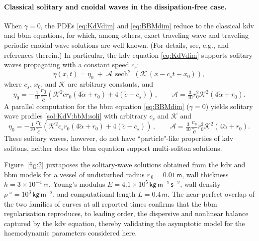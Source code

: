 \documentclass[alpha-refs, 12pt]{wiley-article}
\DeclareMathOperator{\sech}{sech}
\begin{document}
\paragraph{Classical solitary and cnoidal waves in the dissipation‐free case.} When $\gamma=0$, the PDEs \cref{eq:KdVdim} and \cref{eq:BBMdim} reduce to the classical \acrshort{kdv} and \acrshort{bbm} equations, for which, among others, exact traveling wave and traveling periodic cnoidal wave solutions are well known. (For details, see, e.g., \cite{cheviakov2024analytical} and references therein.) In particular, the \acrshort{kdv} equation \cref{eq:KdVdim} supports solitary waves propagating with a constant speed $c_{s}$:
\begin{equation}\label{sol:KdV:bbM:soli}
  \eta(x,t)=\eta_0 \;+\; \mathcal{A}\,\sech^{2}\,\left(\mathcal{K}\,(x-c_{s}t-x_0)\right),
\end{equation}
where $c_s$, $x_0$, and $\mathcal{K}$ are arbitrary constants, and
\[ %
\eta_0 = -\tfrac{1}{10}\dfrac{r_0}{\tilde{c}} \left(\mathcal{K}^2 \tilde{c} r_0 (4 \tilde{\alpha} + r_0) + 4(\tilde{c}-c_s)\right)\,,\qquad \mathcal{A} = \tfrac{3}{10} r_0^2 \mathcal{K}^2 \left(4 \tilde{\alpha}  + r_0\right).
\]
A parallel computation for the \acrshort{bbm} equation \cref{eq:BBMdim} ($\gamma=0$) yields solitary wave profiles \eqref{sol:KdV:bbM:soli} with arbitrary $c_s$ and $\mathcal{K}$ and
\[%
\eta_0 = -\tfrac{1}{10}\dfrac{r_0}{\tilde{c}} \left(\mathcal{K}^2 c_s r_0 (4 \tilde{\alpha} + r_0) + 4(\tilde{c}-c_s)\right)\,,\qquad \mathcal{A} = \tfrac{3}{10} \dfrac{c_s}{\tilde{c}}r_0^2 \mathcal{K}^2 \left(4 \tilde{\alpha}  + r_0\right).
\]
These solitary waves, however, do not have ``particle"-like properties of \acrshort{kdv} solitons, neither does the \acrshort{bbm} equation support multi-soliton solutions.

Figure~\ref{fig:2} juxtaposes the solitary-wave solutions obtained from the \acrshort{kdv} and \acrshort{bbm} models for a vessel of undisturbed radius $r_{\,0}=0.01\,\mathsf{m}$, wall thickness $h=3\times10^{-4}\,\mathsf{m}$, Young’s modulus $E=4.1\times10^{5}\,\mathsf{kg\,m^{-1}\,s^{-2}}$, wall density $\rho^{\;\omega}=10^{3}\,\mathsf{kg\,m^{-3}}$, and computational length $L=0.4\,\mathsf{m}$.
The near-perfect overlap of the two families of curves at all reported times confirms that the \acrshort{bbm} regularisation reproduces, to leading order, the dispersive and nonlinear balance captured by the \acrshort{kdv} equation, thereby validating the asymptotic model for the haemodynamic parameters considered here.
\end{document}
